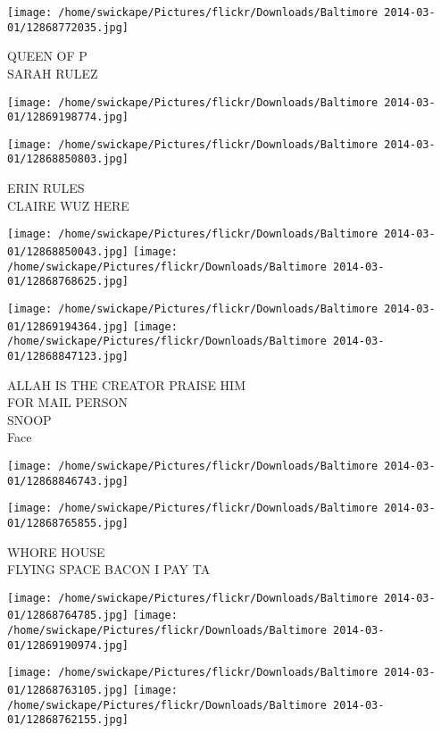 \documentclass[10pt,letterpaper]{article}
\begin{document}
\vspace{0.25in}
\texttt{[image: /home/swickape/Pictures/flickr/Downloads/Baltimore 2014-03-01/12868772035.jpg]}

QUEEN OF P\\
SARAH RULEZ\\
\pagebreak

\texttt{[image: /home/swickape/Pictures/flickr/Downloads/Baltimore 2014-03-01/12869198774.jpg]}

\vspace{0.25in}
\texttt{[image: /home/swickape/Pictures/flickr/Downloads/Baltimore 2014-03-01/12868850803.jpg]}

ERIN RULES\\
CLAIRE WUZ HERE\\
\pagebreak

\texttt{[image: /home/swickape/Pictures/flickr/Downloads/Baltimore 2014-03-01/12868850043.jpg]}
\texttt{[image: /home/swickape/Pictures/flickr/Downloads/Baltimore 2014-03-01/12868768625.jpg]}

\texttt{[image: /home/swickape/Pictures/flickr/Downloads/Baltimore 2014-03-01/12869194364.jpg]}
\texttt{[image: /home/swickape/Pictures/flickr/Downloads/Baltimore 2014-03-01/12868847123.jpg]}

ALLAH IS THE CREATOR PRAISE HIM\\
FOR MAIL PERSON\\
SNOOP\\
Face\\
\pagebreak

\texttt{[image: /home/swickape/Pictures/flickr/Downloads/Baltimore 2014-03-01/12868846743.jpg]}

\vspace{0.25in}
\texttt{[image: /home/swickape/Pictures/flickr/Downloads/Baltimore 2014-03-01/12868765855.jpg]}

WHORE HOUSE\\
FLYING SPACE BACON I PAY TA\\
\pagebreak

\texttt{[image: /home/swickape/Pictures/flickr/Downloads/Baltimore 2014-03-01/12868764785.jpg]}
\texttt{[image: /home/swickape/Pictures/flickr/Downloads/Baltimore 2014-03-01/12869190974.jpg]}

\texttt{[image: /home/swickape/Pictures/flickr/Downloads/Baltimore 2014-03-01/12868763105.jpg]}
\texttt{[image: /home/swickape/Pictures/flickr/Downloads/Baltimore 2014-03-01/12868762155.jpg]}
\end{document}
